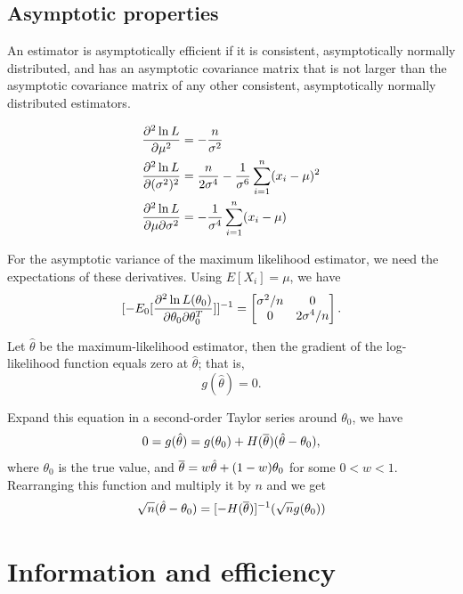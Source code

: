 \begin{refsection}
\subsection{Asymptotic properties}

\begin{definition}\cite[542]{greene2017econometric}
An estimator is asymptotically efficient if it is consistent, asymptotically normally distributed, and has an asymptotic covariance matrix that is not larger than the asymptotic covariance matrix of any other consistent, asymptotically normally distributed estimators.	
\end{definition}


\begin{example}\cite[548]{greene2017econometric}

\begin{align*}
\frac{\partial^2 \ln L}{\partial \mu^2} &= -\frac{n}{\sigma^2} \\
\frac{\partial^2 \ln L}{\partial (\sigma^2)^2} &= \frac{n}{2\sigma^4} - \frac{1}{\sigma^6}\sum_{i=1}^n (x_i - \mu)^2 \\
\frac{\partial^2 \ln L}{\partial \mu \partial \sigma^2} &= -\frac{1}{\sigma^4}\sum_{i=1}^n (x_i - \mu)
\end{align*}	

For the asymptotic variance of the maximum likelihood estimator, we need the expectations of these derivatives. Using $E[X_i] = \mu$, we have
$$[-E_0[\frac{\partial^2 \ln L(\theta_0)}{\partial \theta_0 \partial \theta_0^T}]]^{-1} = \begin{bmatrix}
\sigma^2/n & 0 \\
0 & 2\sigma^4/n
\end{bmatrix}.$$
\end{example}



Let $\hat{\theta}$ be the maximum-likelihood estimator, then the gradient of the log-likelihood function equals zero at $\hat{\theta}$; that is,
$$g(\hat{\theta}) = 0.$$

Expand this equation in a second-order Taylor series around $\theta_0$, we have
$$ 0 = g(\hat{\theta}) = g(\theta_0) + H(\overline{\theta})(\hat{\theta} - \theta_0),$$
where $\theta_0$ is the true value, and $\overline{\theta} = w\hat{\theta} + (1-w)\theta_0$ for some $0<w<1$. Rearranging this function and multiply it by $n$ and we get
$$\sqrt{n}(\hat{\theta} - \theta_0) = [-H(\overline{\theta})]^{-1}(\sqrt{n}g(\theta_0))$$

\section{Information and efficiency}


\end{refsection}
